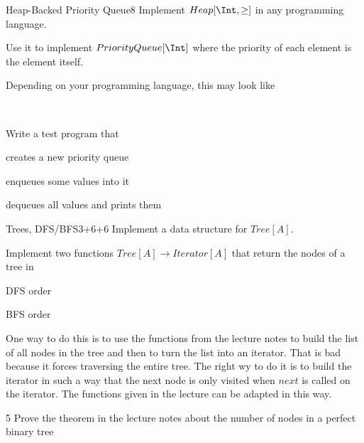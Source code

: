 \documentclass[a4paper]{article}
\begin{document}
\header

\begin{problem}{Heap-Backed Priority Queue}{8}
Implement $Heap[\Int,\geq]$ in any programming language.

Use it to implement $PriorityQueue[\Int]$ where the priority of each element is the element itself.

Depending on your programming language, this may look like
\begin{acode}
\\
\end{acode}

Write a test program that
\begin{compactitem}
 \item creates a new priority queue
 \item enqueues some values into it
 \item dequeues all values and prints them
\end{compactitem}
\end{problem}



\begin{problem}{Trees, DFS/BFS}{3+6+6}
Implement a data structure for $Tree[A]$.

Implement two functions $Tree[A]\to Iterator[A]$ that return the nodes of a tree in
\begin{compactenum}
 \item DFS order
 \item BFS order
\end{compactenum}

One way to do this is to use the functions from the lecture notes to build the list of all nodes in the tree and then to turn the list into an iterator.
That is bad because it forces traversing the entire tree.
The right wy to do it is to build the iterator in such a way that the next node is only visited when $next$ is called on the iterator.
The functions given in the lecture can be adapted in this way.
\end{problem}

\begin{problem}{}{5}
Prove the theorem in the lecture notes about the number of nodes in a perfect binary tree
\end{problem}
\end{document}
